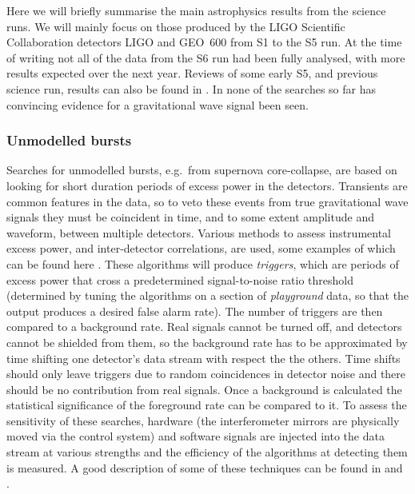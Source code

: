\documentclass{article}
\begin{document}
Here we will briefly summarise the main astrophysics results from the science 
runs. We will mainly focus on those produced by the LIGO Scientific
Collaboration \cite{LSCweb} detectors LIGO and GEO~600 from S1 to the S5 run. 
At the time of writing not all of the data from the S6 run had been
fully analysed, with more results expected over the next year. Reviews of some
early S5, and previous science run, results can also be found in
\cite{Papa:2008, Fairhurst:2009}. In none of the searches so far has convincing
evidence for a gravitational wave signal been seen.

\subsubsection{Unmodelled bursts}\label{subsubsection:unmodelled}
Searches for unmodelled bursts, e.g.~from supernova core-collapse, are based on
looking for short duration periods of excess power in the detectors. Transients
are common features in the data, so to veto these events from true
gravitational wave signals they must be coincident in time, and to some extent
amplitude and waveform, between multiple detectors. Various methods to assess
instrumental excess power, and inter-detector correlations, are used, some
examples of which can be found here \cite{Klimenko:2004, Anderson:2001,
Searle:2008, McNabb:2004, Cadonati:2004, Chatterji:2004, Chatterji:2006}. These
algorithms will produce {\it triggers}, which are periods of excess power that
cross a predetermined signal-to-noise ratio threshold (determined by tuning the
algorithms on a section of {\it playground} data, so that the output produces a
desired false alarm rate). The number of triggers are then compared to a
background rate. Real signals cannot be turned off, and detectors cannot be 
shielded from them, so the background rate has to be approximated by time shifting one
detector's data stream with respect the the others. Time shifts should only
leave triggers due to random coincidences in detector noise and there should
be no contribution from real signals. Once a background is calculated the
statistical significance of the foreground rate can be compared to it. To assess
the sensitivity of these searches, hardware (the interferometer mirrors are
physically moved via the control system) and software signals are injected into
the data stream at various strengths and the efficiency of the algorithms at
detecting them is measured. A good description of some of these techniques can be
found in \cite{Abbott:2004b} and \cite{Abbott:2006a}.
\end{document}
